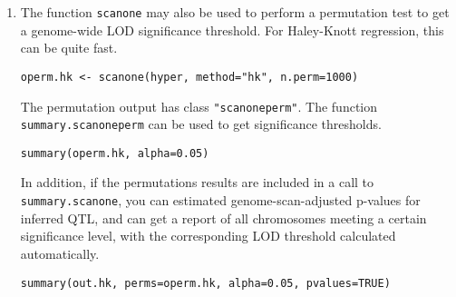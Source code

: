 \documentclass[10pt,letterpaper]{article}
\newcommand{\usercolor}{\color [named]{BlueViolet}}
\begin{document}
\begin{enumerate}
\item The function \verb-scanone- may also be used to perform a
permutation test to get a genome-wide LOD significance threshold.
For Haley-Knott regression, this can be quite fast.

\usercolor 
\verb|operm.hk <- scanone(hyper, method="hk", n.perm=1000)|
\normalcolor

The permutation output has class \verb-"scanoneperm"-.  The function
\verb-summary.scanoneperm- can be used to get significance
thresholds.  

\usercolor 
\verb|summary(operm.hk, alpha=0.05)| 
\normalcolor

In addition, if the permutations results are included in a call to
\verb-summary.scanone-, you can estimated genome-scan-adjusted
p-values for inferred QTL, and can get a report of all chromosomes
meeting a certain significance level, with the corresponding LOD
threshold calculated automatically.

\usercolor
\verb|summary(out.hk, perms=operm.hk, alpha=0.05, pvalues=TRUE)|
\normalcolor

%
%
%
%
%
%
%
%




\end{enumerate}
\end{document}
